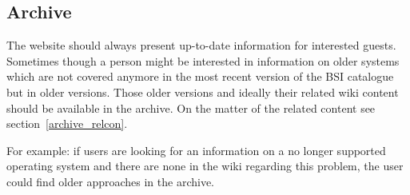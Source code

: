 \subsection{Archive}
\label{archive}
The website should always present up-to-date information for interested guests.
Sometimes though a person might be interested in information on older systems which are not covered anymore in the most recent version of the BSI catalogue but in older versions.
Those older versions and ideally their related wiki content should be available in the archive. 
On the matter of the related content see section~\ref{archive_relcon}.

For example: if users are looking for an information on a no longer supported operating system and there are none in the wiki regarding this problem, the user could find older approaches in the archive. 


